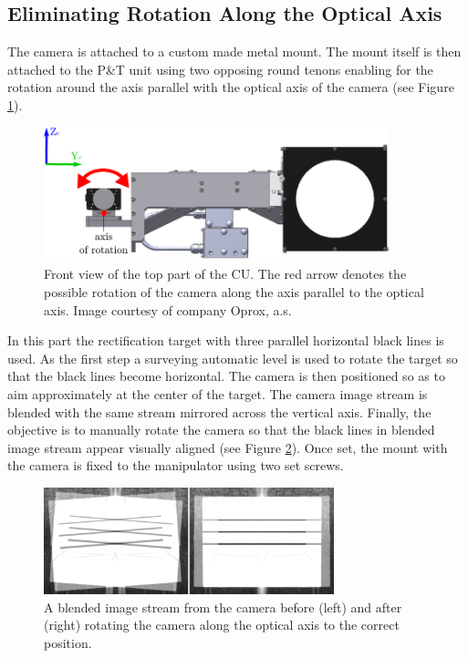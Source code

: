 \subsection{Eliminating Rotation Along the Optical Axis}

The camera is attached to a custom made metal mount. The mount itself is then attached to the P\&T unit using two opposing round tenons enabling for the rotation around the axis parallel with the optical axis of the camera (see Figure \ref{fig:rect_model_front_view}).

\begin{figure}[htb]
	\centering
	\includegraphics[width=10cm]{fig/rect_model_front_view.pdf}
	\caption{Front view of the top part of the CU. The red arrow denotes the possible rotation of the camera along the axis parallel to the optical axis. Image courtesy of company Oprox, a.s.}
	\label{fig:rect_model_front_view}
\end{figure}

In this part the rectification target with three parallel horizontal black lines is used. As the first step a surveying automatic level is used to rotate the target so that the black lines become horizontal. The camera is then positioned so as to aim approximately at the center of the target. The camera image stream is blended with the same stream mirrored across the vertical axis. Finally, the objective is to manually rotate the camera so that the black lines in blended image stream appear visually aligned (see Figure \ref{fig:rect_mirrored_stream}). Once set, the mount with the camera is fixed to the manipulator using two set screws.

\begin{figure}[htb]
	\centering
	\includegraphics[width=0.75\textwidth]{fig/rect_mirrored_stream.png}
	\caption{A blended image stream from the camera before (left) and after (right) rotating the camera along the optical axis to the correct position.}
	\label{fig:rect_mirrored_stream}
\end{figure}

